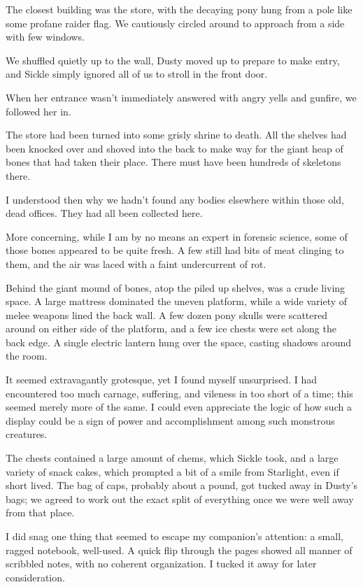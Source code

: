The closest building was the store, with the decaying pony hung from a pole like some profane raider flag. We cautiously circled around to approach from a side with few windows.

We shuffled quietly up to the wall, Dusty moved up to prepare to make entry, and Sickle simply ignored all of us to stroll in the front door.

When her entrance wasn’t immediately answered with angry yells and gunfire, we followed her in.

The store had been turned into some grisly shrine to death. All the shelves had been knocked over and shoved into the back to make way for the giant heap of bones that had taken their place. There must have been hundreds of skeletons there.

I understood then why we hadn’t found any bodies elsewhere within those old, dead offices. They had all been collected here.

More concerning, while I am by no means an expert in forensic science, some of those bones appeared to be quite fresh. A few still had bits of meat clinging to them, and the air was laced with a faint undercurrent of rot.

Behind the giant mound of bones, atop the piled up shelves, was a crude living space. A large mattress dominated the uneven platform, while a wide variety of melee weapons lined the back wall. A few dozen pony skulls were scattered around on either side of the platform, and a few ice chests were set along the back edge. A single electric lantern hung over the space, casting shadows around the room.

It seemed extravagantly grotesque, yet I found myself unsurprised. I had encountered too much carnage, suffering, and vileness in too short of a time; this seemed merely more of the same. I could even appreciate the logic of how such a display could be a sign of power and accomplishment among such monstrous creatures.

The chests contained a large amount of chems, which Sickle took, and a large variety of snack cakes, which prompted a bit of a smile from Starlight, even if short lived. The bag of caps, probably about a pound, got tucked away in Dusty’s bags; we agreed to work out the exact split of everything once we were well away from that place.

I did snag one thing that seemed to escape my companion’s attention: a small, ragged notebook, well-used. A quick flip through the pages showed all manner of scribbled notes, with no coherent organization. I tucked it away for later consideration.

